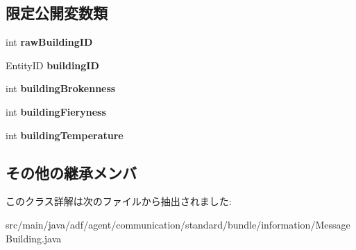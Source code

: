 \subsection*{限定公開変数類}
\begin{DoxyCompactItemize}
\item 
\hypertarget{classadf_1_1agent_1_1communication_1_1standard_1_1bundle_1_1information_1_1MessageBuilding_a5aa4ab2dd6a0fe843ad9f26aed6668b4}{}\label{classadf_1_1agent_1_1communication_1_1standard_1_1bundle_1_1information_1_1MessageBuilding_a5aa4ab2dd6a0fe843ad9f26aed6668b4} 
int {\bfseries raw\+Building\+ID}
\item 
\hypertarget{classadf_1_1agent_1_1communication_1_1standard_1_1bundle_1_1information_1_1MessageBuilding_a67a5f95e085df4050579e0678ed9c300}{}\label{classadf_1_1agent_1_1communication_1_1standard_1_1bundle_1_1information_1_1MessageBuilding_a67a5f95e085df4050579e0678ed9c300} 
Entity\+ID {\bfseries building\+ID}
\item 
\hypertarget{classadf_1_1agent_1_1communication_1_1standard_1_1bundle_1_1information_1_1MessageBuilding_a32cd23f208bf242d268dd6cafb4eb89e}{}\label{classadf_1_1agent_1_1communication_1_1standard_1_1bundle_1_1information_1_1MessageBuilding_a32cd23f208bf242d268dd6cafb4eb89e} 
int {\bfseries building\+Brokenness}
\item 
\hypertarget{classadf_1_1agent_1_1communication_1_1standard_1_1bundle_1_1information_1_1MessageBuilding_abbbca4d13f428f4b05dd0bed7d5ca200}{}\label{classadf_1_1agent_1_1communication_1_1standard_1_1bundle_1_1information_1_1MessageBuilding_abbbca4d13f428f4b05dd0bed7d5ca200} 
int {\bfseries building\+Fieryness}
\item 
\hypertarget{classadf_1_1agent_1_1communication_1_1standard_1_1bundle_1_1information_1_1MessageBuilding_a602e01919129c2c2ccfeeb9072b7668d}{}\label{classadf_1_1agent_1_1communication_1_1standard_1_1bundle_1_1information_1_1MessageBuilding_a602e01919129c2c2ccfeeb9072b7668d} 
int {\bfseries building\+Temperature}
\end{DoxyCompactItemize}
\subsection*{その他の継承メンバ}


このクラス詳解は次のファイルから抽出されました\+:\begin{DoxyCompactItemize}
\item 
src/main/java/adf/agent/communication/standard/bundle/information/Message\+Building.\+java\end{DoxyCompactItemize}
